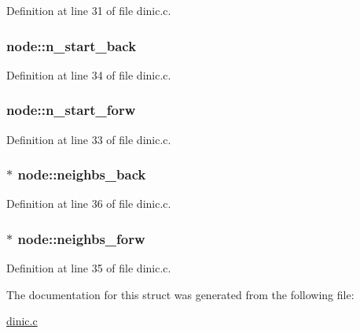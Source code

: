 Definition at line 31 of file dinic.c.

\hypertarget{structnode_a0d05080c7ed6c9265f75426294941b4f}{
\subsubsection[{n\_\-start\_\-back}]{ {\bf node::n\_\-start\_\-back}}}
\label{structnode_a0d05080c7ed6c9265f75426294941b4f}


Definition at line 34 of file dinic.c.

\hypertarget{structnode_a4f82e79344d9435319b2da13f66dde73}{
\subsubsection[{n\_\-start\_\-forw}]{ {\bf node::n\_\-start\_\-forw}}}
\label{structnode_a4f82e79344d9435319b2da13f66dde73}


Definition at line 33 of file dinic.c.

\hypertarget{structnode_a6d63f0f69b6b280e46a3f22bbc7a974f}{
\subsubsection[{neighbs\_\-back}]{$\ast$ {\bf node::neighbs\_\-back}}}
\label{structnode_a6d63f0f69b6b280e46a3f22bbc7a974f}


Definition at line 36 of file dinic.c.

\hypertarget{structnode_a9705979b163af6980b8817b4ef76c0f5}{
\subsubsection[{neighbs\_\-forw}]{$\ast$ {\bf node::neighbs\_\-forw}}}
\label{structnode_a9705979b163af6980b8817b4ef76c0f5}


Definition at line 35 of file dinic.c.



The documentation for this struct was generated from the following file:\begin{DoxyCompactItemize}
\item 
\hyperlink{dinic_8c}{dinic.c}\end{DoxyCompactItemize}
